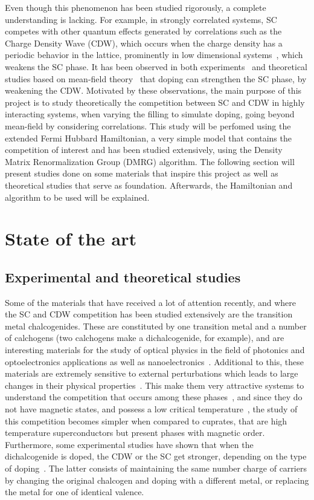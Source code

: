 \documentclass{article}
\begin{document}
Even though this phenomenon has been studied rigorously, a complete understanding is lacking. For example, in strongly correlated systems, SC competes with other quantum effects generated by correlations such as the Charge Density Wave (CDW), which occurs when the charge density has a periodic behavior in the lattice, prominently in low dimensional systems~\cite{CDW}, which weakens the SC phase. It has been observed in both  experiments~\cite{Competition1} and theoretical studies based on mean-field theory~\cite{MeanField} that doping can strengthen the SC phase, by weakening the CDW. Motivated by these observations, the main purpose of this project is to study theoretically the competition between SC and CDW in highly interacting systems, when varying the filling to simulate  doping, going beyond mean-field by considering correlations.  This study will be perfomed using the extended Fermi Hubbard Hamiltonian, a very simple model that contains the competition of interest and has been studied extensively, using the Density Matrix Renormalization Group (DMRG) algorithm. The following section will present studies done on some materials that inspire this project as well as theoretical studies that serve as foundation. Afterwards, the Hamiltonian and algorithm to be used will be explained.

\section{State of the art}
\subsection{Experimental and theoretical studies}

Some of the materials that have received a lot of attention recently, and where the SC and CDW competition has been studied extensively are the transition metal chalcogenides. These are constituted by one transition metal and a number of calchogens (two calchogens make a dichalcogenide, for example), and are interesting materials for the study of optical physics in the field of photonics and optoelectronics applications as well as nanoelectronics~\cite{dical}. Additional to this, these materials are extremely sensitive to external perturbations which leads to large changes in their physical properties~\cite{dical}. This make them very attractive systems to understand the competition that occurs among these phases~\cite{dical}, and since they do not have magnetic states, and possess a low critical temperature~\cite{MeanField}, the study of this competition becomes simpler when compared to cuprates, that are high temperature superconductors but present phases with magnetic order. Furthermore, some experimental studies have shown that when the dichalcogenide is doped, the CDW or the SC get stronger, depending on the type of doping~\cite{Competition1}. The latter consists of maintaining the same number charge of carriers by changing the original chalcogen and doping with a different metal, or replacing the metal for one of identical valence. 
\end{document}
